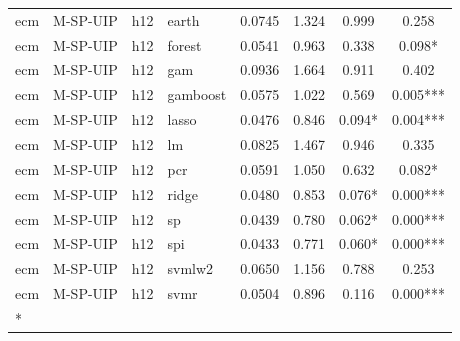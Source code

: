 \begin{ThreePartTable}
\begin{longtable}[t]{llclcccc}
\addlinespace
ecm & M-SP-UIP & h12 & earth & 0.0745 & 1.324 & 0.999 & 0.258\\
ecm & M-SP-UIP & h12 & forest & 0.0541 & 0.963 & 0.338 & 0.098*\\
ecm & M-SP-UIP & h12 & gam & 0.0936 & 1.664 & 0.911 & 0.402\\
ecm & M-SP-UIP & h12 & gamboost & 0.0575 & 1.022 & 0.569 & 0.005***\\
ecm & M-SP-UIP & h12 & lasso & 0.0476 & 0.846 & 0.094* & 0.004***\\
ecm & M-SP-UIP & h12 & lm & 0.0825 & 1.467 & 0.946 & 0.335\\
ecm & M-SP-UIP & h12 & pcr & 0.0591 & 1.050 & 0.632 & 0.082*\\
ecm & M-SP-UIP & h12 & ridge & 0.0480 & 0.853 & 0.076* & 0.000***\\
ecm & M-SP-UIP & h12 & sp & 0.0439 & 0.780 & 0.062* & 0.000***\\
ecm & M-SP-UIP & h12 & spi & 0.0433 & 0.771 & 0.060* & 0.000***\\
ecm & M-SP-UIP & h12 & svmlw2 & 0.0650 & 1.156 & 0.788 & 0.253\\
ecm & M-SP-UIP & h12 & svmr & 0.0504 & 0.896 & 0.116 & 0.000***\\*
\end{longtable}
\end{ThreePartTable}
\endgroup{}
